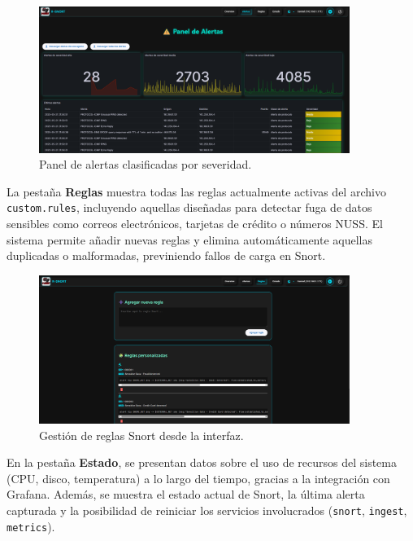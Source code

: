 \documentclass[11pt,a4paper,twoside]{report}
\begin{document}
\begin{figure}[H]
	\centering
	\includegraphics[width=0.9\textwidth]{configuracion/3.png}
	\caption{Panel de alertas clasificadas por severidad.}
	\label{fig:alertas-rsnort}
\end{figure}

La pestaña \textbf{Reglas} muestra todas las reglas actualmente activas del archivo \texttt{custom.rules}, incluyendo aquellas diseñadas para detectar fuga de datos sensibles como correos electrónicos, tarjetas de crédito o números NUSS. El sistema permite añadir nuevas reglas y elimina automáticamente aquellas duplicadas o malformadas, previniendo fallos de carga en Snort.

\begin{figure}[H]
	\centering
	\includegraphics[width=0.9\textwidth]{configuracion/4.png}
	\caption{Gestión de reglas Snort desde la interfaz.}
	\label{fig:reglas-rsnort}
\end{figure}

\newpage

En la pestaña \textbf{Estado}, se presentan datos sobre el uso de recursos del sistema (CPU, disco, temperatura) a lo largo del tiempo, gracias a la integración con Grafana. Además, se muestra el estado actual de Snort, la última alerta capturada y la posibilidad de reiniciar los servicios involucrados (\texttt{snort}, \texttt{ingest}, \texttt{metrics}).
\end{document}
